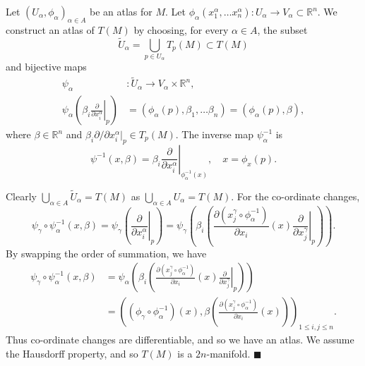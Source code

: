 \documentclass[letter-paper]{tufte-book}
\newenvironment{proof}[1][Proof]{\begin{trivlist}
\item[\hskip \labelsep {\bfseries #1}]}{\end{trivlist}}
\newcommand{\qed}{\hfill$\blacksquare$}
\begin{document}
\begin{proof}
  Let $(U_\alpha, \phi_\alpha)_{\alpha \in A}$ be an atlas for $M$. Let $\phi_\alpha (x_1^\alpha, \ldots x_n^\alpha) : U_\alpha \to V_\alpha \subset \mathbb{R}^n$. We construct an atlas of $T(M)$ by choosing, for every $\alpha \in A$, the subset
  \begin{equation*}
    \tilde{U}_\alpha = \bigcup_{p\in U_\alpha} T_p(M) \subset T(M)
  \end{equation*}
  and bijective maps
  \begin{align*}
    \psi_\alpha &: \tilde{U}_\alpha \to V_\alpha \times \mathbb{R}^n,\\
    \psi_\alpha\left(\beta_i \left.\frac{\partial}{\partial x_i^\alpha}\right|_p\right) &= \left(\phi_\alpha(p), \beta_1, \ldots \beta_n\right) = \left(\phi_\alpha(p), \beta\right),
  \end{align*}
  where $\beta \in \mathbb{R}^n$ and $\beta_i \partial / \partial x_i^\alpha|_p \in T_p(M)$. The inverse map $\psi_\alpha^{-1}$ is
  \begin{equation*}
    \psi^{-1}(x, \beta) = \beta_i \left.\frac{\partial}{\partial x_i^\alpha}\right|_{\phi^{-1}_\alpha(x)}, \quad x=\phi_x(p).
  \end{equation*}
  
  Clearly $\bigcup_{\alpha\in A} \tilde{U}_\alpha = T(M)$ as $\bigcup_{\alpha\in A} U_\alpha = T(M)$. For the co-ordinate changes, 
  \begin{equation*}
    \psi_\gamma \circ \psi^{-1}_\alpha(x, \beta) = \psi_\gamma\left(\left.\frac{\partial}{\partial x_i^\alpha}\right|_p\right) = \psi_\gamma \left(\beta_i \left(\frac{\partial(x_j^\gamma \circ \phi^{-1}_\alpha)}{\partial x_i}(x)\left.\frac{\partial}{\partial x_j^\gamma}\right|_p\right)\right).
  \end{equation*}
  By swapping the order of summation, we have
  \begin{align*}
    \psi_\gamma \circ \psi^{-1}_\alpha(x, \beta) 
      &= \psi_\alpha \left(\beta_i \left(\frac{\partial(x_j^\gamma \circ \phi^{-1}_\alpha)}{\partial x_i}(x)\left.\frac{\partial}{\partial x_j^\gamma}\right|_p\right)\right) \\
      &= \left( \left(\phi_\gamma \circ \phi^{-1}_\alpha\right)(x), \beta \left(\frac{\partial(x_j^\gamma \circ \phi^{-1}_\alpha)}{\partial x_i}(x)\right) \right)_{1\leq i,j\leq n}.
  \end{align*}
  Thus co-ordinate changes are differentiable, and so we have an atlas. We assume the Hausdorff property, and so $T(M)$ is a $2n$-manifold. \qed
\end{proof}
\end{document}

